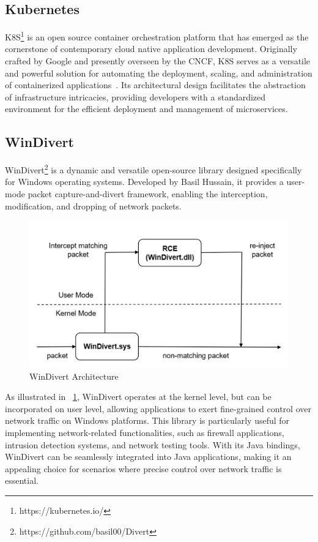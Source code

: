 \subsection{Kubernetes}
\label{subsec:kubernetes}
\acf{K8S}\footnote{https://kubernetes.io/} is an open source container orchestration platform that has emerged as the cornerstone of contemporary cloud native application development. Originally crafted by Google and presently overseen by the \ac{CNCF}, \ac{K8S} serves as a versatile and powerful solution for automating the deployment, scaling, and administration of containerized applications~\cite{burns2022kubernetes}. Its architectural design facilitates the abstraction of infrastructure intricacies, providing developers with a standardized environment for the efficient deployment and management of microservices.~\cite{noauthor_production-grade_nodate}

\subsection{WinDivert}
WinDivert\footnote{https://github.com/basil00/Divert} is a dynamic and versatile open-source library designed specifically for Windows operating systems. Developed by Basil Hussain, it provides a user-mode packet capture-and-divert framework, enabling the interception, modification, and dropping of network packets.

\begin{figure}
    \centering
    \includegraphics[width=\linewidth]{files/figures/WinDivert.png}
    \caption{WinDivert Architecture}
    \label{fig:WinDivert}
\end{figure}

As illustrated in ~\cref{fig:WinDivert}, WinDivert operates at the kernel level, but can be incorporated on user level, allowing applications to exert fine-grained control over network traffic on Windows platforms. This library is particularly useful for implementing network-related functionalities, such as firewall applications, intrusion detection systems, and network testing tools. With its Java bindings, WinDivert can be seamlessly integrated into Java applications, making it an appealing choice for scenarios where precise control over network traffic is essential.~\cite{noauthor_windivert:_nodate}

